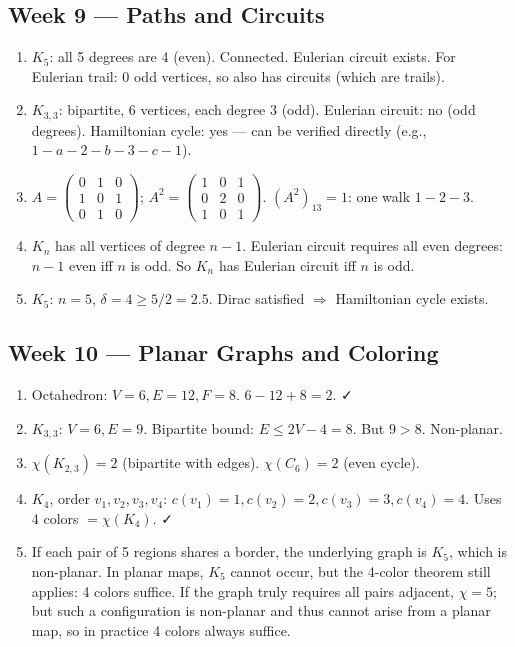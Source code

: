 \documentclass[11pt]{article}
\begin{document}
\subsection*{Week 9 — Paths and Circuits}
\begin{enumerate}[nosep,label=\arabic*.]
  \item $K_5$: all 5 degrees are 4 (even). Connected. Eulerian circuit exists. For Eulerian trail: 0 odd vertices, so also has circuits (which are trails).
  \item $K_{3,3}$: bipartite, 6 vertices, each degree 3 (odd). Eulerian circuit: no (odd degrees). Hamiltonian cycle: yes — can be verified directly (e.g., $1{-}a{-}2{-}b{-}3{-}c{-}1$).
  \item $A=\begin{pmatrix}0&1&0\\1&0&1\\0&1&0\end{pmatrix}$; $A^2=\begin{pmatrix}1&0&1\\0&2&0\\1&0&1\end{pmatrix}$. $(A^2)_{13}=1$: one walk $1{-}2{-}3$.
  \item $K_n$ has all vertices of degree $n-1$. Eulerian circuit requires all even degrees: $n-1$ even iff $n$ is odd. So $K_n$ has Eulerian circuit iff $n$ is odd.
  \item $K_5$: $n=5$, $\delta=4\ge5/2=2.5$. Dirac satisfied $\Rightarrow$ Hamiltonian cycle exists.
\end{enumerate}

\subsection*{Week 10 — Planar Graphs and Coloring}
\begin{enumerate}[nosep,label=\arabic*.]
  \item Octahedron: $V=6,E=12,F=8$. $6-12+8=2$. ✓
  \item $K_{3,3}$: $V=6,E=9$. Bipartite bound: $E\le2V-4=8$. But $9>8$. Non-planar.
  \item $\chi(K_{2,3})=2$ (bipartite with edges). $\chi(C_6)=2$ (even cycle).
  \item $K_4$, order $v_1,v_2,v_3,v_4$: $c(v_1)=1,c(v_2)=2,c(v_3)=3,c(v_4)=4$. Uses 4 colors $=\chi(K_4)$. ✓
  \item If each pair of 5 regions shares a border, the underlying graph is $K_5$, which is non-planar. In planar maps, $K_5$ cannot occur, but the 4-color theorem still applies: 4 colors suffice. If the graph truly requires all pairs adjacent, $\chi=5$; but such a configuration is non-planar and thus cannot arise from a planar map, so in practice 4 colors always suffice.
\end{enumerate}
\end{document}
